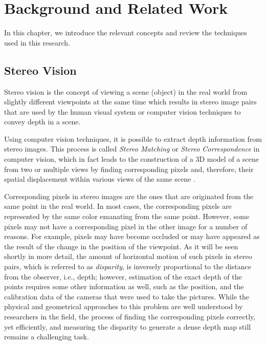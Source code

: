 \chapter{Background and Related Work}
\label{chap:Background}

In this chapter, we introduce the relevant concepts and review the techniques used in this research.

\section{Stereo Vision}

Stereo vision is the concept of viewing a scene (object) in the real world from slightly different
viewpoints at the same time which results in stereo image pairs that are used by the human visual system or computer vision techniques to convey
depth in a scene. 

Using computer vision techniques, it is possible to extract depth information from stereo
images. This process is called {\it Stereo Matching} or {\it Stereo Correspondence} in computer vision,
which in fact leads to the construction of a
3D model of a scene from two or multiple views by finding corresponding pixels and, therefore, their spatial displacement within various views of the same scene \cite{sze11}.

Corresponding pixels in stereo images are the ones that are originated from the same point in the real
world. In most cases, the corresponding pixels are represented by the same color emanating from the same point. However, some pixels may not have a corresponding 
pixel in the other image for a number of reasons. For example, pixels may have become occluded or may have appeared as the result of the change in the position
of the viewpoint. 
As it will be seen shortly in more detail, the amount of horizontal motion of such pixels
in stereo pairs, which is referred to as {\it disparity}, is inversely proportional to the
distance from the observer, i.e., depth; however,  estimation of the exact depth of the points requires some
other information as well, such as the position, and the calibration data of the cameras that were used to take the pictures.
While the physical and geometrical approaches to this problem are well understood by researchers in the field, the process of finding the corresponding pixels correctly, 
yet efficiently, and measuring the disparity to generate a dense depth map still remains a challenging task.

